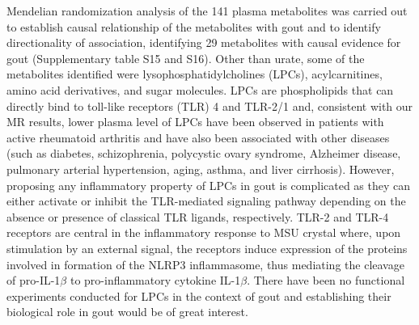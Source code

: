 \documentclass[a4paper,10pt]{article}
\begin{document}
Mendelian randomization analysis of the 141 plasma metabolites was carried out to establish causal relationship of the metabolites with gout and to identify directionality of association, identifying 29 metabolites with causal evidence for gout (Supplementary table S15 and S16).
Other than urate, some of the metabolites identified were lysophosphatidylcholines (LPCs), acylcarnitines, amino acid derivatives, and sugar molecules.
LPCs are phospholipids that can directly bind to toll-like receptors (TLR) 4 and TLR-2/1\citep{carneiro_lysophosphatidylcholine_2013} and, consistent with our MR results, lower plasma level of LPCs have been observed in patients with active rheumatoid arthritis\citep{koh_lipidome_2022,fuchs_phosphatidylcholinelysophosphatidylcholine_2005} and have also been associated with other diseases (such as diabetes, schizophrenia, polycystic ovary syndrome, Alzheimer disease, pulmonary arterial hypertension, aging, asthma, and liver cirrhosis)\citep{knuplez_updated_2020}.
However, proposing any inflammatory property of LPCs in gout is complicated as they can either activate or inhibit the TLR-mediated signaling pathway depending on the absence or presence of classical TLR ligands, respectively\citep{carneiro_lysophosphatidylcholine_2013,knuplez_updated_2020}.
TLR-2 and TLR-4 receptors are central in the inflammatory response to MSU crystal where, upon stimulation by an external signal, the receptors induce expression of the proteins involved in formation of the NLRP3 inflammasome, thus mediating the cleavage of pro-IL-1$\beta$ to pro-inflammatory cytokine IL-1$\beta$\citep{major_update_2018}.
There have been no functional experiments conducted for LPCs in the context of gout and establishing their biological role in gout would be of great interest.
\\
\end{document}
